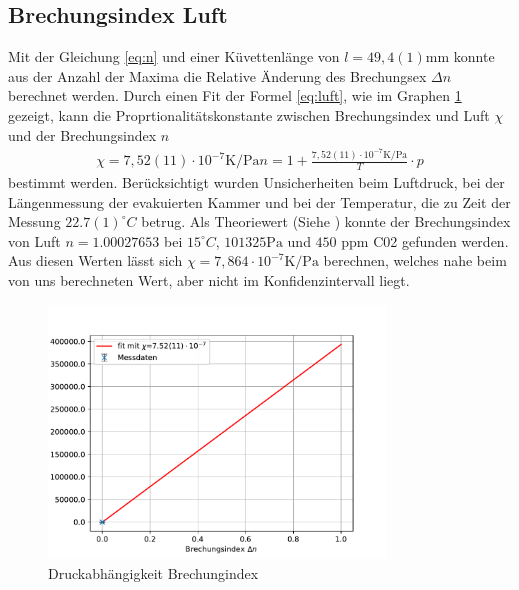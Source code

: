 \documentclass[11pt, a4paper]{article}
\begin{document}
   
    \subsection{Brechungsindex Luft}
    Mit der Gleichung \ref{eq:n} und einer Küvettenlänge von $l = 49,4(1) \si{\milli\metre}$ konnte aus der Anzahl der Maxima die Relative Änderung des Brechungsex $\Delta n$ berechnet werden.
    Durch einen Fit der Formel \ref{eq:luft}, wie im Graphen \ref{fig:druck} gezeigt, kann die Proprtionalitätskonstante zwischen Brechungsindex und Luft $\chi$ und der Brechungsindex $n$
    \begin{align}
        \chi = 7,52(11) \cdot 10^{-7} \si{\kelvin\per\pascal}
        n = 1 + \frac{7,52(11) \cdot 10^{-7} \si{\kelvin\per\pascal}}{T} \cdot p
    \end{align}
    bestimmt werden. Berücksichtigt wurden Unsicherheiten beim Luftdruck, bei der Längenmessung der evakuierten Kammer und bei der Temperatur, die zu Zeit der Messung $22.7(1) ^{\circ}C$ betrug. Als Theoriewert (Siehe \cite{theoluft}) konnte der Brechungsindex von Luft $n = 1.00027653$ bei $15 ^{\circ}C$, $101325 \si{\pascal}$ und $450$ ppm C02 gefunden werden. Aus diesen Werten lässt sich $\chi = 7,864 \cdot 10^{-7}  \si{\kelvin\per\pascal}$ berechnen, welches nahe beim von uns berechneten Wert, aber nicht im Konfidenzintervall liegt.
    
    \begin{figure}
        \centering
        \includegraphics[width=0.8\textwidth]{./plots/druck.pdf}
        \caption{Druckabhängigkeit Brechungindex}
        \label{fig:druck}
    \end{figure}
\end{document}
